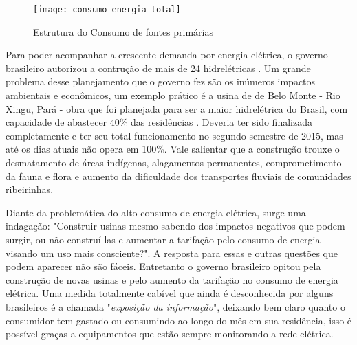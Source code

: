 \begin{figure}[h!]
	\texttt{[image: consumo\_energia\_total]}
	\centering
	\caption[Estrutura do Consumo de fontes primárias]{Estrutura do Consumo de fontes primárias}
	\label{fig:consumo_energia_total}
\end{figure}
\FloatBarrier

Para poder acompanhar a crescente demanda por energia elétrica, o governo brasileiro autorizou a contrução de mais de 24 hidrelétricas \cite{governo-preve}.
Um grande problema desse planejamento que o governo fez são os inúmeros impactos ambientais e econômicos, um exemplo prático é a usina de de Belo Monte - Rio Xingu, Pará - obra que foi planejada
para ser a maior hidrelétrica do Brasil, com capacidade de abastecer 40\% das residências \cite{energia-abastece}.
Deveria ter sido finalizada completamente e ter seu total funcionamento no segundo semestre de 2015, mas até os dias atuais não opera em 100\%. Vale salientar que a construção
trouxe o desmatamento de áreas indígenas, alagamentos permanentes, comprometimento da fauna e flora e aumento da dificuldade dos transportes fluviais
de comunidades ribeirinhas.

Diante da problemática do alto consumo de energia elétrica, surge uma indagação: "Construir usinas mesmo sabendo dos impactos negativos que podem surgir, ou não construí-las e
aumentar a tarifação pelo consumo de energia visando um uso mais consciente?". A resposta para essas e outras questões que podem aparecer não são fáceis.
Entretanto o governo brasileiro opitou pela construção de novas usinas e pelo aumento da tarifação no consumo de energia elétrica. 
Uma medida totalmente cabível que ainda é desconhecida por alguns brasileiros é a chamada "\textit{exposição da informação}", deixando bem claro 
quanto o consumidor tem gastado ou consumindo ao longo do mês em sua residência, isso é possível graças a equipamentos que estão sempre monitorando
a rede elétrica.



